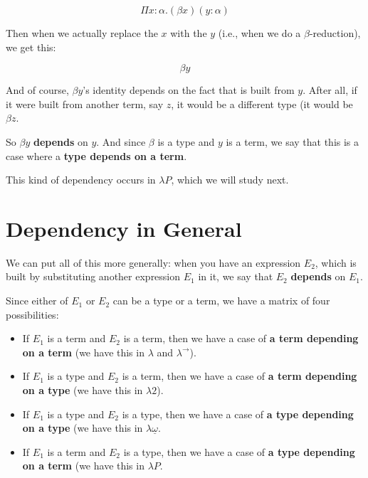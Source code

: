 \documentclass{book}
\numberwithin{equation}{chapter}
\newcommand{\vocab}{\textbf}
\begin{document}
\begin{equation}
\Pi x : \alpha.(\beta x) (y : \alpha)
\end{equation}

\noindent
Then when we actually replace the $x$ with the $y$ (i.e., when we do a $\beta$-reduction), we get this:

\begin{equation}
\beta y
\end{equation}

\noindent
And of course, $\beta y$'s identity depends on the fact that is built from $y$. After all, if it were built from another term, say $z$, it would be a different type (it would be $\beta z$. 

So $\beta y$ \vocab{depends} on $y$. And since $\beta$ is a type and $y$ is a term, we say that this is a case where a \vocab{type depends on a term}.

This kind of dependency occurs in $\lambda P$, which we will study next.


\section{Dependency in General}

We can put all of this more generally: when you have an expression $E_{2}$, which is built by substituting another expression $E_{1}$ in it, we say that $E_{2}$ \vocab{depends} on $E_{1}$. 

Since either of $E_{1}$ or $E_{2}$ can be a type or a term, we have a matrix of four possibilities:

\begin{itemize}
\item{If $E_{1}$ is a term and $E_{2}$ is a term, then we have a case of \vocab{a term depending on a term} (we have this in $\lambda$ and $\lambda^{\rightarrow}$).}
\item{If $E_{1}$ is a type and $E_{2}$ is a term, then we have a case of \vocab{a term depending on a type} (we have this in $\lambda2$).}
\item{If $E_{1}$ is a type and $E_{2}$ is a type, then we have a case of \vocab{a type depending on a type} (we have this in $\lambda\underline{\omega}$.}
\item{If $E_{1}$ is a term and $E_{2}$ is a type, then we have a case of \vocab{a type depending on a term} (we have this in $\lambda P$.}
\end{itemize}
\end{document}
